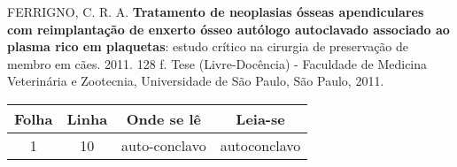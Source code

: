 \noindent FERRIGNO, C. R. A. \textbf{Tratamento de neoplasias ósseas apendiculares com reimplantação de enxerto ósseo autólogo autoclavado associado ao plasma rico em plaquetas}: estudo crítico na cirurgia de preservação de membro em cães. 2011. 128 f. Tese (Livre-Docência) - Faculdade de Medicina Veterinária e Zootecnia, Universidade de São Paulo, São Paulo, 2011.

\begin{table}[h!]
	\center
        \renewcommand{\arraystretch}{1.5}
	\begin{tabular}{|p{1.4cm}|p{1.1cm}|p{3cm}|p{3cm}|}
		\hline
		\multicolumn{1}{|c}{\textbf{Folha}} & \multicolumn{1}{|c}{\textbf{Linha}} & \multicolumn{1}{|c}{\textbf{Onde se lê}} &
		\multicolumn{1}{|c|}{\textbf{Leia-se}} \\
		\hline
		\multicolumn{1}{|c}{1} & \multicolumn{1}{|c}{10} & \multicolumn{1}{|c}{auto-conclavo} & \multicolumn{1}{|c|}{autoconclavo} \\
		\hline
	\end{tabular}\label{tab:table}
\end{table}
